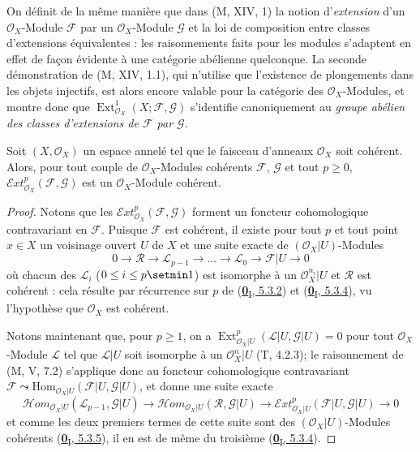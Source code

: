 \begin{env}[12.3.2]
\label{0.12.3.2-fr}
On définit de la même manière que dans (M, XIV, 1) la notion d'\emph{extension} d'un
$\mathcal O_X$-Module $\mathcal F$ par un $\mathcal O_X$-Module $\mathcal G$
et la loi de composition entre classes d'extensions équivalentes : les
raisonnements faits pour les modules s'adaptent en effet de façon évidente à
une catégorie abélienne quelconque. La seconde démonstration de (M, XIV, 1.1),
qui n'utilise que l'existence de plongements dans les objets injectifs, est
alors encore valable pour la catégorie des $\mathcal O_X$-Modules, et montre
donc que $\operatorname{Ext}_{\mathcal O_X}^1(X;\mathcal F,\mathcal G)$
s'identifie canoniquement au \emph{groupe abélien des classes d'extensions de
$\mathcal F$ par $\mathcal G$}.
\end{env}

\begin{proposition}[12.3.3]
\label{0.12.3.3-fr}
Soit $(X,\mathcal O_X)$ un espace annelé tel que le faisceau d'anneaux
$\mathcal O_X$ soit cohérent. Alors, pour tout couple de
$\mathcal O_X$-Modules cohérents $\mathcal F$, $\mathcal G$ et tout
$p\geq0$, $\mathcal{E}xt_{\mathcal O_X}^p(\mathcal F,\mathcal G)$ est un
$\mathcal O_X$-Module cohérent.
\end{proposition}

\begin{proof}
Notons que les $\mathcal{E}xt_{\mathcal O_X}^p(\mathcal F,\mathcal G)$
forment un foncteur cohomologique contravariant en $\mathcal F$. Puisque
$\mathcal F$ est cohérent, il existe pour tout $p$ et tout point $x\in X$ un
voisinage ouvert $U$ de $X$ et une suite exacte de
$(\mathcal O_X|U)$-Modules
\[
0\longrightarrow\mathcal R\longrightarrow\mathcal L_{p-1}
\longrightarrow\ldots\longrightarrow\mathcal L_0
\longrightarrow\mathcal F|U\longrightarrow0
\]
où chacun des $\mathcal L_i$ ($0\leq i\leq p\setmin 1$) est isomorphe à un
$\mathcal O_X^{n_i}|U$ et $\mathcal R$ est cohérent : cela résulte par
récurrence sur $p$ de (\hyperref[0.5.3.2-fr]{\textbf{0}\textsubscript{I}, 5.3.2}) et
(\hyperref[0.5.3.4-fr]{\textbf{0}\textsubscript{I}, 5.3.4}), vu l'hypothèse que
$\mathcal O_X$ est cohérent.

Notons maintenant que, pour $p\geq1$, on a
$\operatorname{Ext}_{\mathcal O_X|U}^p(\mathcal L|U,\mathcal G|U)=0$
pour tout $\mathcal O_X$-Module $\mathcal L$ tel que $\mathcal L|U$ soit
isomorphe à un $\mathcal O_X^n|U$ (T, 4.2.3); le raisonnement de (M, V, 7.2)
s'applique donc au foncteur cohomologique contravariant
$\mathcal F\leadsto
\mathrm{Hom}_{\mathcal O_X|U}(\mathcal F|U,\mathcal G|U)$,
et donne une suite exacte
\[
\mathcal{H}om_{\mathcal O_X|U}(\mathcal L_{p-1},\mathcal G|U)
\longrightarrow
\mathcal{H}om_{\mathcal O_X|U}(\mathcal R,\mathcal G|U)
\longrightarrow
\mathcal{E}xt_{\mathcal O_X|U}^p(\mathcal F|U,\mathcal G|U)
\longrightarrow0
\]
et comme les deux premiers termes de cette suite sont des
$(\mathcal O_X|U)$-Modules cohérents
(\hyperref[0.5.3.5-fr]{\textbf{0}\textsubscript{I}, 5.3.5}), il en est de même du
troisième (\hyperref[0.5.3.4-fr]{\textbf{0}\textsubscript{I}, 5.3.4}).
\end{proof}

